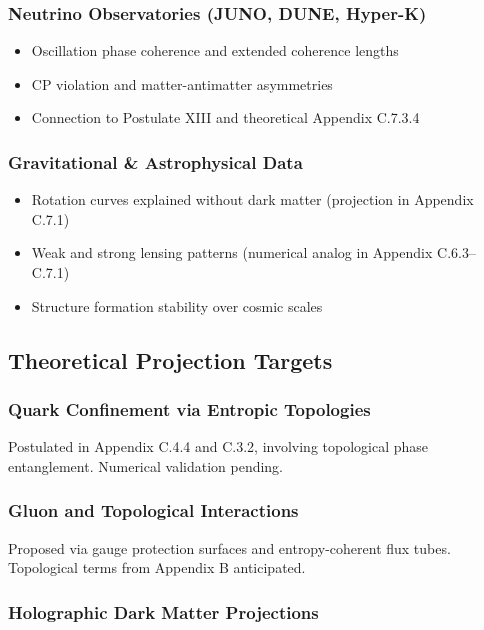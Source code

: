 \documentclass[10.5pt,a4paper]{article}
\begin{document}
\subsubsection{Neutrino Observatories (JUNO, DUNE, Hyper-K)}

\begin{itemize}
  \item Oscillation phase coherence and extended coherence lengths
  \item CP violation and matter-antimatter asymmetries
  \item Connection to Postulate XIII and theoretical Appendix C.7.3.4
\end{itemize}

\subsubsection{Gravitational \& Astrophysical Data}

\begin{itemize}
  \item Rotation curves explained without dark matter (projection in Appendix C.7.1)
  \item Weak and strong lensing patterns (numerical analog in Appendix C.6.3--C.7.1)
  \item Structure formation stability over cosmic scales
\end{itemize}

\subsection{Theoretical Projection Targets}

\subsubsection{Quark Confinement via Entropic Topologies}

Postulated in Appendix C.4.4 and C.3.2, involving topological phase entanglement. Numerical validation pending.

\subsubsection{Gluon and Topological Interactions}

Proposed via gauge protection surfaces and entropy-coherent flux tubes. Topological terms from Appendix B anticipated.

\subsubsection{Holographic Dark Matter Projections}
\end{document}
